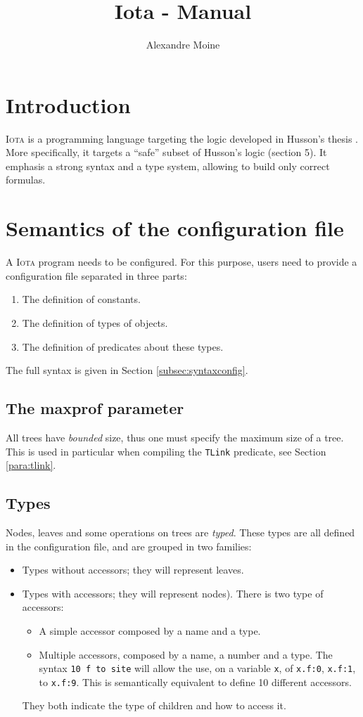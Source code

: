 \documentclass[10pt,a4paper]{article}
\author{Alexandre Moine}
\title{Iota - Manual}
\newcommand\Iota{\textsc{Iota}}
\newcommand{\ocaml}{\texttt}
\begin{document}
\maketitle
\tableofcontents

\section{Introduction}
\Iota{} is a programming language targeting the logic developed in Husson's thesis \cite{husson}. More specifically, it targets a ``safe'' subset of Husson's logic (section 5). It emphasis a strong syntax and a type system, allowing to build only correct formulas.

\section{Semantics of the configuration file}
A \Iota{} program needs to be configured. For this purpose, users need to provide a configuration file separated in three parts:
\begin{enumerate}
\item The definition of constants.
\item The definition of types of objects.
\item The definition of predicates about these types.
\end{enumerate}

The full syntax is given in Section \ref{subsec:syntaxconfig}.
\subsection{The maxprof parameter}
All trees have \emph{bounded} size, thus one must specify the maximum size of a tree. This is used in particular when compiling the \ocaml{TLink} predicate, see Section \ref{para:tlink}.

\subsection{Types}
Nodes, leaves and some operations on trees are \emph{typed}. These types are all defined in the configuration file, and are grouped in two families:
\begin{itemize}
\item Types without accessors; they will represent leaves.
\item Types with accessors; they will represent nodes). There is two type of accessors:
  \begin{itemize}
  \item A simple accessor composed by a name and a type.
  \item Multiple accessors, composed by a name, a number and a type. The syntax \ocaml{10 f to site} will allow the use, on a variable \ocaml{x}, of \ocaml{x.f:0}, \ocaml{x.f:1}, to \ocaml{x.f:9}. This is semantically equivalent to define 10 different accessors.
  \end{itemize}
  They both indicate the type of children and how to access it.
\end{itemize}
\end{document}
